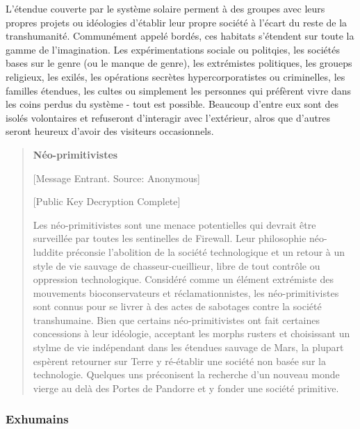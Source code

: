                                    L'étendue couverte par le système solaire perment à des groupes avec leurs propres projets ou idéologies d'établir leur propre société à l'écart du reste de la transhumanité. Communément appelé bordés, ces habitats s'étendent sur toute la gamme de l'imagination. Les expérimentations sociale ou politqies, les sociétés bases sur le genre (ou le manque de genre), les extrémistes politiques, les groueps religieux, les exilés, les opérations secrètes hypercorporatistes ou criminelles, les familles étendues, les cultes ou simplement les personnes qui préfèrent vivre dans les coins perdus du système - tout est possible. Beaucoup d'entre eux sont des isolés volontaires et refuseront d'interagir avec l'extérieur, alros que d'autres seront heureux d'avoir des visiteurs occasionnels. 

                                    \begin{quotation} \textbf{Néo-primitivistes} 

                                       [Message Entrant. Source: Anonymous] 

                                       [Public Key Decryption Complete] 

                                       Les néo-primitivistes sont une menace potentielles qui devrait être surveillée par toutes les sentinelles de Firewall. Leur philosophie néo-luddite préconsie l'abolition de la société technologique et un retour à un style de vie sauvage de chasseur-cueillieur, libre de tout contrôle ou oppression technologique. Considéré comme un élément extrémiste des mouvements bioconservateurs et réclamationnistes, les néo-primitivistes sont connus pour se livrer à des actes de sabotages contre la société transhumaine. Bien que certains néo-primitivistes ont fait certaines concessions à leur idéologie, acceptant les morphs rusters et choisissant un stylme de vie indépendant dans les étendues sauvage de Mars, la plupart espèrent retourner sur Terre y ré-établir une société non basée sur la technologie. Quelques uns préconisent la recherche d'un nouveau monde vierge au delà des Portes de Pandorre et y fonder une société primitive. \end{quotation} 

                                       \subsubsection{Exhumains} \label{sec:exhumans} 

